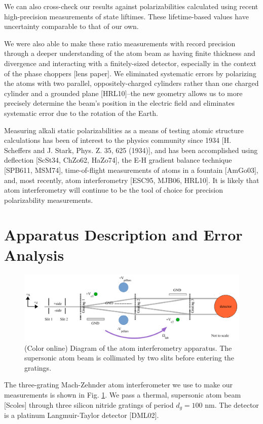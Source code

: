 \documentclass[twocolumn, prl,showpacs,superscriptaddress]{revtex4-1}   %
\newcommand{\figref}[1]{Fig. \ref{#1}}
\begin{document}
We can also cross-check our results against polarizabilities calculated using recent high-precision measurements of state liftimes. These lifetime-based values have uncertainty comparable to that of our own.

We were also able to make these ratio measurements with record precision through a deeper understanding of the atom beam as having finite thickness and divergence and interacting with a finitely-sized detector, especially in the context of the phase choppers [lens paper]. We eliminated systematic errors by polarizing the atoms with two parallel, oppositely-charged cylinders rather than one charged cylinder and a grounded plane [HRL10]--the new geometry allows us to more precisely determine the beam's position in the electric field and eliminates systematic error due to the rotation of the Earth.

Measuring alkali static polarizabilities as a means of testing atomic 
structure calculations has been of interest to the physics community since
1934 [H. Scheffers and J. Stark, Phys. Z. 35, 625 (1934)], and has been
accomplished using deflection [ScSt34, ChZo62, HaZo74], the E-H gradient
balance technique [SPB611, MSM74], time-of-flight measurements of atoms
in a fountain [AmGo03], and, most recently, atom interferometry 
[ESC95, MJB06, HRL10]. It is likely that atom interferometry will continue to be the tool of choice for precision polarizability measurements.

\section{Apparatus Description and Error Analysis}

\begin{figure}
\includegraphics[width=\linewidth,keepaspectratio]{IFM_diagram.pdf}
\caption{\label{IFMDiagram}(Color online) Diagram of the atom interferometry apparatus. The supersonic atom beam is collimated by two slits before entering the gratings.}
\end{figure}

The three-grating Mach-Zehnder atom interferometer we use to make our measurements is shown in \figref{IFMDiagram}. We pass a thermal, supersonic atom beam [Scoles] through three silicon nitride gratings of period $d_g = 100$ nm. The detector is a platinum Langmuir-Taylor detector [DML02].
\end{document}
